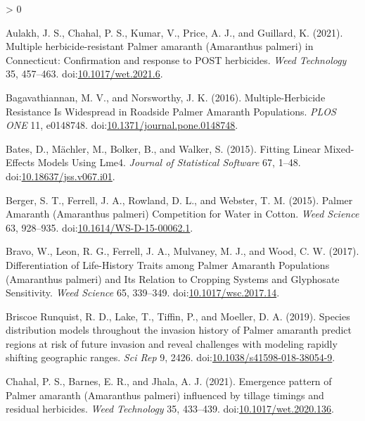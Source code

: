 \documentclass[utf8]{frontiersSCNS}
\newlength{\cslhangindent}
\newenvironment{CSLReferences}[2] %
 {%
  \setlength{\parindent}{0pt}
  \ifodd #1 \everypar{\setlength{\hangindent}{\cslhangindent}}\ignorespaces\fi
  \ifnum #2 > 0
  \setlength{\parskip}{#2\baselineskip}
  \fi
 }%
 {}
\begin{document}
\hypertarget{refs}{}
\begin{CSLReferences}{1}{0}
\leavevmode\hypertarget{ref-aulakh2021}{}%
Aulakh, J. S., Chahal, P. S., Kumar, V., Price, A. J., and Guillard, K.
(2021). Multiple herbicide-resistant {Palmer} amaranth ({Amaranthus}
palmeri) in {Connecticut}: Confirmation and response to {POST}
herbicides. \emph{Weed Technology} 35, 457--463.
doi:\href{https://doi.org/10.1017/wet.2021.6}{10.1017/wet.2021.6}.

\leavevmode\hypertarget{ref-bagavathiannan2016}{}%
Bagavathiannan, M. V., and Norsworthy, J. K. (2016). Multiple-{Herbicide
Resistance Is Widespread} in {Roadside Palmer Amaranth Populations}.
\emph{PLOS ONE} 11, e0148748.
doi:\href{https://doi.org/10.1371/journal.pone.0148748}{10.1371/journal.pone.0148748}.

\leavevmode\hypertarget{ref-bates2015}{}%
Bates, D., Mächler, M., Bolker, B., and Walker, S. (2015). Fitting
{Linear Mixed}-{Effects Models Using} Lme4. \emph{Journal of Statistical
Software} 67, 1--48.
doi:\href{https://doi.org/10.18637/jss.v067.i01}{10.18637/jss.v067.i01}.

\leavevmode\hypertarget{ref-berger2015}{}%
Berger, S. T., Ferrell, J. A., Rowland, D. L., and Webster, T. M.
(2015). Palmer {Amaranth} ({Amaranthus} palmeri) {Competition} for
{Water} in {Cotton}. \emph{Weed Science} 63, 928--935.
doi:\href{https://doi.org/10.1614/WS-D-15-00062.1}{10.1614/WS-D-15-00062.1}.

\leavevmode\hypertarget{ref-bravo2017}{}%
Bravo, W., Leon, R. G., Ferrell, J. A., Mulvaney, M. J., and Wood, C. W.
(2017). Differentiation of {Life}-{History Traits} among {Palmer
Amaranth Populations} ({Amaranthus} palmeri) and {Its Relation} to
{Cropping Systems} and {Glyphosate Sensitivity}. \emph{Weed Science} 65,
339--349.
doi:\href{https://doi.org/10.1017/wsc.2017.14}{10.1017/wsc.2017.14}.

\leavevmode\hypertarget{ref-briscoerunquist2019}{}%
Briscoe Runquist, R. D., Lake, T., Tiffin, P., and Moeller, D. A.
(2019). Species distribution models throughout the invasion history of
{Palmer} amaranth predict regions at risk of future invasion and reveal
challenges with modeling rapidly shifting geographic ranges. \emph{Sci
Rep} 9, 2426.
doi:\href{https://doi.org/10.1038/s41598-018-38054-9}{10.1038/s41598-018-38054-9}.

\leavevmode\hypertarget{ref-chahal2021}{}%
Chahal, P. S., Barnes, E. R., and Jhala, A. J. (2021). Emergence pattern
of {Palmer} amaranth ({Amaranthus} palmeri) influenced by tillage
timings and residual herbicides. \emph{Weed Technology} 35, 433--439.
doi:\href{https://doi.org/10.1017/wet.2020.136}{10.1017/wet.2020.136}.


\end{CSLReferences}
\end{document}
